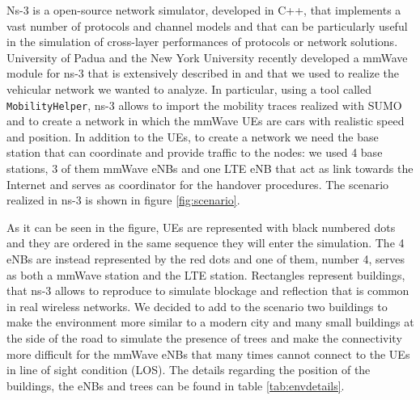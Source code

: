\documentclass[conference,10pt]{IEEEtran}
\begin{document}
Ns-3 is a open-source network simulator, developed in C++, that implements a vast number of protocols and channel models and that can be particularly useful in the simulation of cross-layer performances of protocols or network solutions. University of Padua and the New York University recently developed a mmWave module for ns-3 that is extensively described in \cite{e2esim} and that we used to realize the vehicular network we wanted to analyze. In particular, using a tool called \texttt{MobilityHelper}, ns-3 allows to import the mobility traces realized with SUMO and to create a network in which the mmWave UEs are cars with realistic speed and position. In addition to the UEs, to create a network we need the base station that can coordinate and provide traffic to the nodes: we used 4 base stations, 3 of them mmWave eNBs and one LTE eNB that act as link towards the Internet and serves as coordinator for the handover procedures. The scenario realized in ns-3 is shown in figure \ref{fig:scenario}.

As it can be seen in the figure, UEs are represented with black numbered dots and they are ordered in the same sequence they will enter the simulation. The 4 eNBs are instead represented by the red dots and one of them, number 4, serves as both a mmWave station and the LTE station. Rectangles represent buildings, that ns-3 allows to reproduce to simulate blockage and reflection that is common in real wireless networks. We decided to add to the scenario two buildings to make the environment more similar to a modern city and many small buildings at the side of the road to simulate the presence of trees and make the connectivity more difficult for the mmWave eNBs that many times cannot connect to the UEs in line of sight condition (LOS).
The details regarding the position of the buildings, the eNBs and trees can be found in table \ref{tab:envdetails}.
\end{document}

